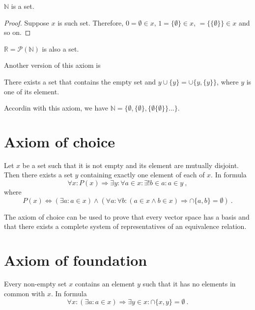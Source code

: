     \begin{theorem}
        $\mathbb N$ is a set.
    \end{theorem}
    \begin{proof}
        Suppose $x$ is such set. Therefore, $0 = \emptyset \in x$, $1 = \{\emptyset\} \in x$, $  = \{\{\emptyset\}\} \in x$ and so on.
    \end{proof}
    \noindent $\mathbb R = \mathcal P(\mathbb N)$ is also a set.

    Another version of this axiom is 
    \begin{axiom}[Infinity 2]
        There exists a set that contains the empty set and $y \cup \{y\} = \cup \{y, \{y\}\}$, where $y$ is one of its element.
    \end{axiom}
    Accordin with this axiom, we have $\mathbb N = \{\emptyset, \{\emptyset\}, \{\emptyset \{\emptyset\}\} \ldots \}$.

\section{Axiom of choice}

    \begin{axiom}[Choice]
        Let $x$ be a set such that it is not empty and its element are mutually disjoint. Then there exists a set $y$ containing exactly one element of each of $x$. In formula
        \begin{equation*}
            \forall x \colon P(x) \Rightarrow \exists y \colon \forall a \in x \colon \exists ! b \in a \colon a \in y ~,
        \end{equation*}
        where
        \begin{equation*}
            P(x) \Leftrightarrow (\exists a \colon a \in x ) \land (\forall a \colon \forall b \colon (a \in x \land b \in x) \Rightarrow \cap \{a,b\} = \emptyset) ~.
        \end{equation*}
    \end{axiom}

    The axiom of choice can be used to prove that every vector space has a basis and that there exists a complete system of representatives of an equivalence relation.

\section{Axiom of foundation}

    \begin{axiom}[Foundation]
        Every non-empty set $x$ contains an element $y$ such that it has no elements in common with $x$. In formula
        \begin{equation*}
            \forall x \colon (\exists a \colon a \in x) \Rightarrow \exists y \in x \colon \cap \{x, y\} = \emptyset ~.
        \end{equation*}
    \end{axiom}

